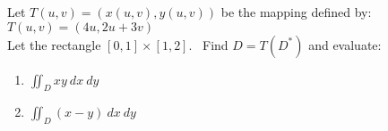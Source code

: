 Let $T(u, v) = (x(u, v), y(u, v))$ be the mapping defined by:
\\$T(u, v) = (4u, 2u+3v)$ 
\\Let the rectangle $[0,1] \times [1,2].$ \ Find $D = T(D^*)$ and evaluate:

\begin{enumerate}[label=(\alph*), itemsep=0.4em, topsep=0.5em]
	\item $\displaystyle \iint_D xy \ dx \ dy$
	\item $\displaystyle \iint_D (x-y) \ dx \ dy$
\end{enumerate}
